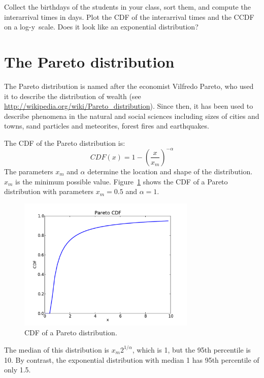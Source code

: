 \documentclass[12pt]{book}
\begin{document}
\begin{exercise}
Collect the birthdays of the students in your class, sort them, and
compute the interarrival times in days.  Plot the CDF of the interarrival
times and the CCDF on a log-y~scale.  Does it look like
an exponential distribution?

\end{exercise}


\section{The Pareto distribution}

The Pareto distribution is named after the economist Vilfredo Pareto,
who used it to describe the distribution of wealth (see
\url{http://wikipedia.org/wiki/Pareto_distribution}).  Since then, it has
been used to describe phenomena in the natural and social
sciences including sizes of cities and towns, sand particles and
meteorites, forest fires and earthquakes.

The CDF of the Pareto distribution is:
%
\[ CDF(x) = 1 - \left( \frac{x}{x_m} \right) ^{-\alpha} \]
%
The parameters $x_{m}$ and $\alpha$ determine the location and shape of
the distribution. $x_{m}$ is the minimum possible value.
Figure~\ref{pareto_cdf} shows the CDF of a Pareto distribution with
parameters $x_{m} = 0.5$ and $\alpha = 1$.

\begin{figure}
\centerline{\includegraphics[height=2.5in]{figs/pareto_cdf.pdf}}
\caption{CDF of a Pareto distribution.}
\label{pareto_cdf}
\end{figure}

The median of this distribution is $x_m 2^{1/\alpha}$, which is 1, but
the 95th percentile is 10.  By contrast, the exponential distribution
with median 1 has 95th percentile of only 1.5.    
\end{document}
